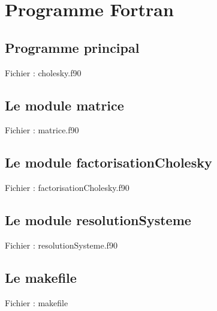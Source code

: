 \documentclass[a4paper, titlepage]{livret}													%
\begin{document}
\appendix

\chapter{Programme Fortran}
	\lstset{language=[90]Fortran,
		inputencoding=utf8/latin1
		}

	\section{Programme principal}
		Fichier : cholesky.f90

		

	\section{Le module matrice}
		Fichier : matrice.f90
	
		

	\section{Le module factorisationCholesky}
		Fichier : factorisationCholesky.f90
	
		

	\section{Le module resolutionSysteme}
		Fichier : resolutionSysteme.f90
	
		

	\section{Le makefile}
		Fichier : makefile
		\lstset{language=make} 
	
		
\end{document}
